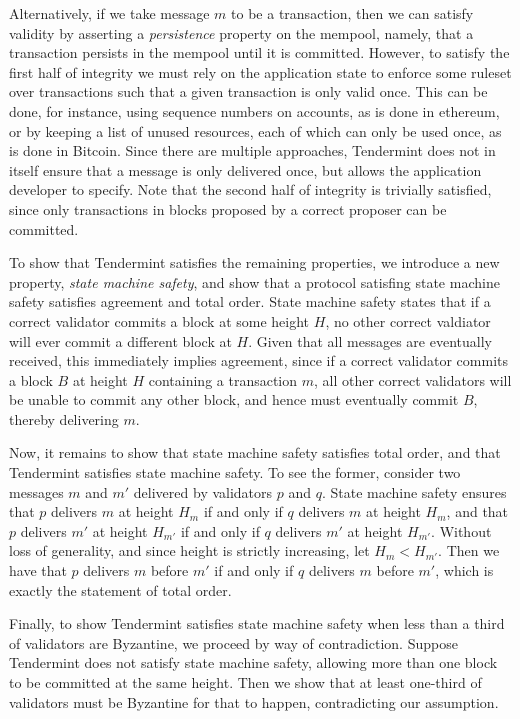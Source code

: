 Alternatively, if we take message $m$ to be a transaction, 
then we can satisfy validity by asserting a \emph{persistence}
property on the mempool, namely, that a transaction persists in the mempool 
until it is committed.
However, to satisfy the first half of integrity we must 
rely on the application state to enforce some ruleset over 
transactions such that a given transaction is only valid once. 
This can be done, for instance, using sequence numbers on accounts,
as is done in ethereum, 
or by keeping a list of unused resources, each of which can only be used once,
as is done in Bitcoin.
Since there are multiple approaches,
Tendermint does not in itself ensure that a message is only delivered once,
but allows the application developer to specify.
Note that the second half of integrity is trivially satisfied,
since only transactions in blocks proposed by a correct proposer can be committed.

To show that Tendermint satisfies the remaining properties,
we introduce a new property, \emph{state machine safety},
and show that a protocol satisfing state machine safety satisfies
agreement and total order.
State machine safety states that if a correct validator commits a block at some height $H$,
no other correct valdiator will ever commit a different block at $H$.
Given that all messages are eventually received, 
this immediately implies agreement, since if a correct validator commits a block $B$ at height $H$ 
containing a transaction $m$, all other correct validators will be unable to commit any other block,
and hence must eventually commit $B$, thereby delivering $m$.

Now, it remains to show that state machine safety satisfies total order,
and that Tendermint satisfies state machine safety.
To see the former, consider two messages $m$ and $m'$ delivered by validators $p$ and $q$.
State machine safety ensures that $p$ delivers $m$ at height $H_m$ if and only if
$q$ delivers $m$ at height $H_m$, and that $p$ delivers $m'$ at height $H_{m'}$ 
if and only if $q$ delivers $m'$ at height $H_{m'}$. 
Without loss of generality, and since height is strictly increasing, let $H_m < H_{m'}$.
Then we have that $p$ delivers $m$ before $m'$ if and only if $q$ delivers $m$ before $m'$,
which is exactly the statement of total order.

Finally, to show Tendermint satisfies state machine safety when less than a third of 
validators are Byzantine, we proceed by way of contradiction.
Suppose Tendermint does not satisfy state machine safety, 
allowing more than one block to be committed at the same height.
Then we show that at least one-third of validators must be Byzantine for that to happen,
contradicting our assumption.

